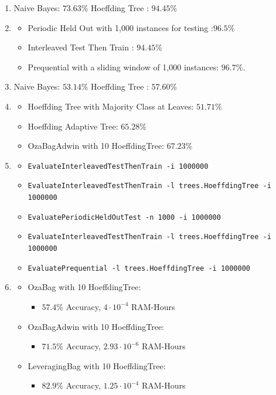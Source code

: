 \documentclass[a4paper,12pt]{article}
\begin{document}
\begin{enumerate}
 \item Naive Bayes: $73.63\%$ Hoeffding Tree : $ 94.45\%$
 \item \begin{itemize}
        \item Periodic Held Out with 1,000 instances for testing :$96.5\%$
	\item Interleaved Test Then Train : $ 94.45\%$
	\item Prequential with a sliding window of 1,000 instances: $96.7\%$.
       \end{itemize}
\item Naive Bayes: $53.14\%$ Hoeffding Tree : $57.60\%$
\item \begin{itemize}
       \item Hoeffding Tree with Majority Class at Leaves: $51.71\%$
       \item Hoeffding Adaptive Tree: $65.28\%$
	\item OzaBagAdwin with 10 HoeffdingTree: $67.23\%$
      \end{itemize}
\item \begin{itemize}
        \item \texttt{EvaluateInterleavedTestThenTrain -i 1000000}
	\item \texttt{EvaluateInterleavedTestThenTrain -l trees.HoeffdingTree -i 1000000}
	\item \texttt{EvaluatePeriodicHeldOutTest -n 1000 -i 1000000}
	\item \texttt{EvaluateInterleavedTestThenTrain -l trees.HoeffdingTree -i 1000000}
	\item \texttt{EvaluatePrequential -l trees.HoeffdingTree -i 1000000}
       \end{itemize}
\item \begin{itemize}
 \item %
 OzaBag with 10 HoeffdingTree:
\begin{itemize} \item  
$57.4\%$ Accuracy, $4 \cdot 10^{-4}$ RAM-Hours
\end{itemize}
 \item %
 OzaBagAdwin with 10 HoeffdingTree: 
\begin{itemize} \item  
$71.5\%$ Accuracy, $2.93 \cdot 10^{-6}$ RAM-Hours
\end{itemize}
 \item %
 LeveragingBag with 10 HoeffdingTree:
\begin{itemize} \item 
 $82.9\%$ Accuracy, $1.25 \cdot 10^{-4}$  RAM-Hours 
 \end{itemize}
\end{itemize}

\end{enumerate}
\end{document}
